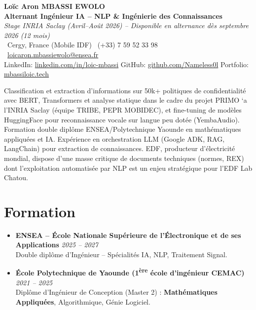 \documentclass[a4paper,11pt]{article}
\begin{document}
\begin{center}
    {\Large \textbf{Lo\"ic Aron MBASSI EWOLO}} \\ \vspace{4pt}
    \textbf{\large Alternant Ing\'enieur IA -- NLP \& Ing\'enierie des Connaissances} \\
    \textit{\small Stage INRIA Saclay (Avril--Ao\^ut 2026) -- Disponible en alternance d\`es septembre 2026 (12 mois)} \\ \vspace{4pt}
    \small
    \Pointinghand\ Cergy, France (Mobile IDF) \quad \Mobilefone\ (+33) 7 59 52 33 98 \quad
    {\color{primary}\Letter\ \href{mailto:loicaron.mbassiewolo@ensea.fr}{loicaron.mbassiewolo@ensea.fr}} \\ \vspace{2pt}
    {\color{primary}LinkedIn: \href{https://www.linkedin.com/in/loic-mbassi/}{linkedin.com/in/loic-mbassi}} \quad
    {\color{primary}GitHub: \href{https://github.com/Nameless0l}{github.com/Nameless0l}} \quad
    {\color{primary}Portfolio: \href{https://mbassiloic.tech}{mbassiloic.tech}}
\end{center}
\vspace{-6pt}
\noindent\small{Classification et extraction d'informations sur 50k+ politiques de confidentialit\'e avec BERT, Transformers et analyse statique dans le cadre du projet PRIMO `a l'INRIA Saclay (\'equipe TRIBE, PEPR MOBIDEC), et fine-tuning de mod\`eles HuggingFace pour reconnaissance vocale sur langue peu dot\'ee (YembaAudio). Formation double dipl\^ome ENSEA/Polytechnique Yaounde en math\'ematiques appliqu\'ees et IA. Exp\'erience en orchestration LLM (Google ADK, RAG, LangChain) pour extraction de connaissances. EDF, producteur d'\'electricit\'e mondial, dispose d'une masse critique de documents techniques (normes, REX) dont l'exploitation automatis\'ee par NLP est un enjeu strat\'egique pour l'EDF Lab Chatou.}

\section{Formation}
\begin{itemize}[leftmargin=*, label=\tiny$\bullet$, nosep]
    \item \textbf{ENSEA -- \'Ecole Nationale Sup\'erieure de l'\'Electronique et de ses Applications} \hfill \textit{2025 -- 2027} \\
    \small{Double dipl\^ome d'Ing\'enieur -- Sp\'ecialit\'es IA, NLP, Traitement Signal.}
    \item \textbf{\'Ecole Polytechnique de Yaounde (1\textsuperscript{\`ere} \'ecole d'ing\'enieur CEMAC)} \hfill \textit{2021 -- 2025} \\
    \small{Dipl\^ome d'Ing\'enieur de Conception (Master 2) : \textbf{Math\'ematiques Appliqu\'ees}, Algorithmique, G\'enie Logiciel.}
\end{itemize}
\end{document}
